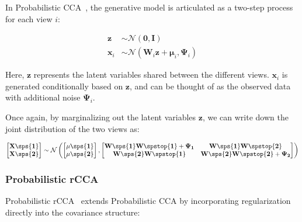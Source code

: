 In Probabilistic CCA~\cite{bach2005probabilistic}, the generative model is articulated as a two-step process for each view \(i\):

\begin{align}
    \mathbf{z}& \sim \mathcal{N}(\mathbf{0}, \mathbf{I})                                            \\
    \mathbf{x}_i & \sim \mathcal{N}(\mathbf{W}_i \mathbf{z} + \boldsymbol{\mu}_i, \boldsymbol{\Psi}_i)
\end{align}

Here, \(\mathbf{z}\) represents the latent variables shared between the different views. \(\mathbf{x}_i\) is generated conditionally based on \(\mathbf{z}\), and can be thought of as the observed data with additional noise \(\boldsymbol{\Psi}_i\).


Once again, by marginalizing out the latent variables \(\mathbf{z}\), we can write down the joint distribution of the two views as:

\begin{align}
    \begin{bmatrix} \bold{X\sps{1}} \\ \bold{X\sps{2}} \end{bmatrix} \sim \mathcal{N} \left( \begin{bmatrix} \bold{\mu\sps{1}} \\ \bold{\mu\sps{2}} \end{bmatrix}, \begin{bmatrix} \bold{W\sps{1}W\spstop{1}} + \bold{\Psi_1} & \bold{W\sps{1}W\spstop{2}} \\ \bold{W\sps{2}W\spstop{1}} & \bold{W\sps{2}W\spstop{2}} + \bold{\Psi_2} \end{bmatrix} \right)
\end{align}

\subsubsection{Probabilistic rCCA}

Probabilistic rCCA~\cite{de2003regularization} extends Probabilistic CCA by incorporating regularization directly into the covariance structure:

